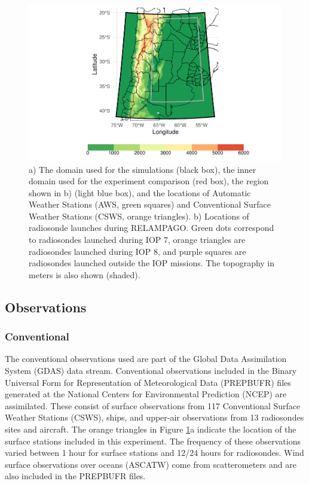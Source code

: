 \documentclass[preprint, 3p, authoryear,review, 12pt]{elsarticle} %
\begin{document}
\begin{figure}
\includegraphics[width=0.98\linewidth]{../figures/dominio-1} \caption{a) The domain used for the simulations (black box), the inner domain used for the experiment comparison (red box), the region shown in b) (light blue box), and the locations of Automatic Weather Stations (AWS, green squares) and Conventional Surface Weather Stations (CSWS, orange triangles). b) Locations of radiosonde launches during RELAMPAGO. Green dots correspond to radiosondes launched during IOP 7, orange triangles are radiosondes launched during IOP 8, and purple squares are radiosondes launched outside the IOP missions. The topography in meters is also shown (shaded).}\label{fig:dominio}
\end{figure}

\hypertarget{observations}{%
\subsection{Observations}\label{observations}}

\hypertarget{conventional}{%
\subsubsection{Conventional}\label{conventional}}

The conventional observations used are part of the Global Data Assimilation System (GDAS) data stream. Conventional observations included in the Binary Universal Form for Representation of Meteorological Data (PREPBUFR) files generated at the National Centers for Environmental Prediction (NCEP) are assimilated. These consist of surface observations from 117 Conventional Surface Weather Stations (CSWS), ships, and upper-air observations from 13 radiosondes sites and aircraft. The orange triangles in Figure \ref{fig:dominio}a indicate the location of the surface stations included in this experiment. The frequency of these observations varied between 1 hour for surface stations and 12/24 hours for radiosondes. Wind surface observations over oceans (ASCATW) come from scatterometers and are also included in the PREPBUFR files.
\end{document}
